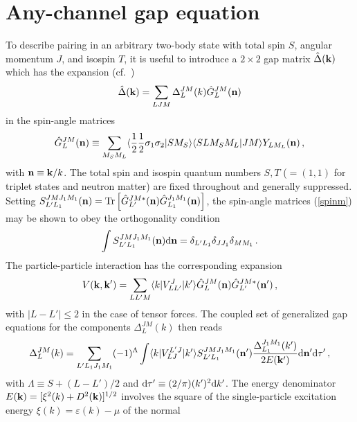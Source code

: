 \section{Any-channel gap equation \label{sec:gapeqn}}
To describe pairing in an arbitrary two-body state with total spin $S$,
angular momentum $J$, and isospin $T$, it is useful to introduce a
$2 \times 2$ gap matrix ${\hat \Delta}({\bf k})$ which has the 
expansion (cf.~\cite{ttr,t72})
\begin{equation}
{\hat \Delta}({\bf k}) = \sum_{LJM} \Delta^{JM}_L(k)
{\hat G}^{JM}_L({\bf n})
 \label{matgap}
\end{equation}
in the spin-angle matrices
\begin{equation}
{\hat G}^{JM}_L({\bf n})  \equiv\sum_{M_S M_L} \langle \frac12\frac12
\sigma_1\sigma_2| S M_S\rangle \langle SL M_S M_L |
JM\rangle Y_{LM_L} ({\bf n}) \, ,
\label{spinm}
\end{equation}
with ${\bf n} \equiv {\bf k}/k$.
The total spin and isospin quantum numbers $S,T$ ($=(1,1)$ for triplet
states and neutron matter) are fixed throughout and generally suppressed.
Setting $S^{JMJ_1M_1}_{L'L_1}({\bf n})={\rm Tr}
\left[{\hat G}^{JM*}_{L'}({\bf n}){\hat G}_{L_1}^{J_1M_1}({\bf n})\right]$,
the spin-angle matrices (\ref{spinm}) may be shown to obey the orthogonality
condition
\begin{equation}
\int S^{JMJ_1M_1}_{L'L_1}({\bf n}){\rm d}{\bf n}=\delta_{L'L_1}
\delta_{JJ_1}\delta_{MM_1} \, .
\label{ort1}
\end{equation}
The particle-particle interaction has the corresponding expansion
\begin{equation}
V({\bf k},{\bf k}')=\sum_{LL'M}\langle k|V_{LL'}^J|
k' \rangle {\hat G}^{JM}_L({\bf n}){\hat G}_{L'}^{JM*}({\bf n}') \, ,
\label{potex}
\end{equation}
with $|L-L'|\leq 2$ in the case of tensor forces.  The coupled set
of generalized gap equations for the components $\Delta^{JM}_L(k)$
then reads
\begin{equation}
\Delta_L^{JM}(k)= \sum_{L'L_1J_1M_1}(-1)^{\Lambda} \int
  \langle k|V_{LJ}^{L'J}|k'\rangle S^{JMJ_1M_1}_{L'L_1}({\bf n}')
  {\Delta_{L_1}^{J_1M_1}(k')\over 2E({\bf k}')}{\rm d}{\bf n}'
  {\rm d}\tau' \, ,
\label{gengap}
\end{equation}
with $\Lambda \equiv S+(L-L')/2$ and 
$ {\rm d}\tau' \equiv (2/\pi)(k')^2{\rm d} k' $.  The energy 
denominator $E({\bf k})=[\xi^2(k)+D^2({\bf k})]^{1/2}$ 
involves the square of the single-particle excitation energy 
$\xi(k)=\varepsilon(k)-\mu$ of the normal 
